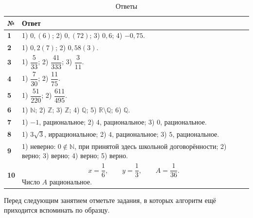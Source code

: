 \documentclass[a4paper,12pt]{article}
\newcommand{\N}{\mathbb{N}}
\newcommand{\Z}{\mathbb{Z}}
\newcommand{\Q}{\mathbb{Q}}
\newcommand{\R}{\mathbb{R}}
\begin{document}
\begin{table}[ht]
\centering
\caption{Ответы}
\begin{tabularx}{\linewidth}{
    >{\bfseries}p{11mm}
    X
}
\toprule
№ & Ответ \\
\midrule

1 &
1) \(0{,}(6)\);
2) \(0{,}(72)\);
3) \(0{,}6\);
4) \(-0{,}75\).
\\

2 &
1) \(0{,}2(7)\);
2) \(0{,}58(3)\).
\\

3 &
1) \(\dfrac5{33}\);
2) \(\dfrac{41}{333}\);
3) \(\dfrac3{11}\).
\\

4 &
1) \(\dfrac7{30}\);
2) \(\dfrac{11}{75}\).
\\

5 &
1) \(\dfrac{51}{220}\);
2) \(\dfrac{611}{495}\).
\\

6 &
1) \(\N\);
2) \(\Z\);
3) \(\Z\);
4) \(\Q\);
5) \(\R\setminus\Q\);
6) \(\Q\).
\\

7 &
1) \(-1\), рациональное;
2) \(4\), рациональное;
3) \(0\), рациональное.
\\

8 &
1) \(3\sqrt3\), иррациональное;
2) \(4\), рациональное;
3) \(5\), рациональное.
\\

9 &
1) неверно: \(0\notin\N\), при принятой здесь школьной договорённости;
2) верно;
3) верно;
4) верно;
5) верно.
\\

10 &
\[
x=\frac16,\qquad
y=\frac13,\qquad
A=\frac1{36}.
\]
Число \(A\) рациональное.
\\

\bottomrule
\end{tabularx}
\end{table}

\vfill

\begin{center}
\textcolor{softgray}{
\small
Перед следующим занятием отметьте задания,
в которых алгоритм ещё приходится вспоминать по образцу.
}
\end{center}
\end{document}
